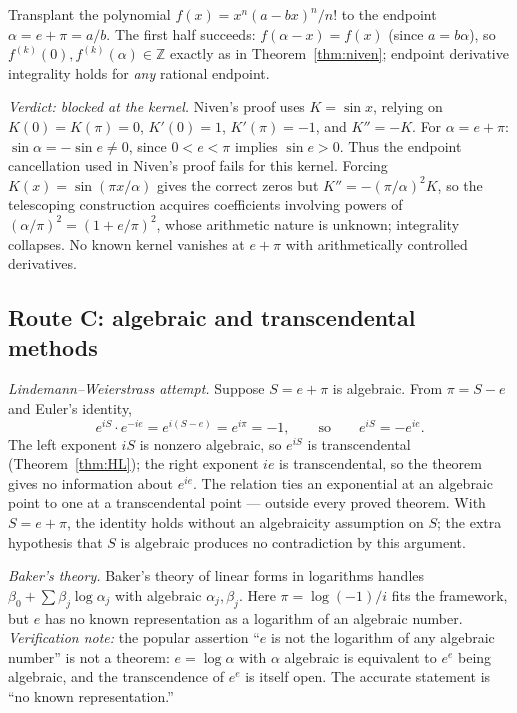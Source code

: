 \documentclass[11pt]{amsart}
\theoremstyle{definition}
\theoremstyle{remark}
\numberwithin{equation}{section}
\newcommand{\Z}{\mathbb{Z}}
\newcommand{\ee}{e}
\begin{document}
Transplant the polynomial $f(x)=x^n(a-bx)^n/n!$ to the endpoint $\alpha=e+\pi=a/b$. The first half succeeds: $f(\alpha-x)=f(x)$ (since $a=b\alpha$), so $f^{(k)}(0),f^{(k)}(\alpha)\in\Z$ exactly as in Theorem~\ref{thm:niven}; endpoint derivative integrality holds for \emph{any} rational endpoint.

\emph{Verdict: blocked at the kernel.} Niven's proof uses $K=\sin x$, relying on $K(0)=K(\pi)=0$, $K'(0)=1$, $K'(\pi)=-1$, and $K''=-K$. For $\alpha=e+\pi$: $\sin\alpha=-\sin e\ne0$, since $0<e<\pi$ implies $\sin e>0$. Thus the endpoint cancellation used in Niven's proof fails for this kernel. Forcing $K(x)=\sin(\pi x/\alpha)$ gives the correct zeros but $K''=-(\pi/\alpha)^2K$, so the telescoping construction acquires coefficients involving powers of $(\alpha/\pi)^2=(1+e/\pi)^2$, whose arithmetic nature is unknown; integrality collapses. No known kernel vanishes at $e+\pi$ with arithmetically controlled derivatives.

\subsection{Route C: algebraic and transcendental methods}\label{sub:route-c}

\emph{Lindemann--Weierstrass attempt.} Suppose $S=e+\pi$ is algebraic. From $\pi=S-e$ and Euler's identity,
\[
\ee^{iS}\cdot\ee^{-ie}=\ee^{i(S-e)}=\ee^{i\pi}=-1,\qquad\text{so}\qquad \ee^{iS}=-\ee^{ie}.
\]
The left exponent $iS$ is nonzero algebraic, so $\ee^{iS}$ is transcendental (Theorem~\ref{thm:HL}); the right exponent $ie$ is transcendental, so the theorem gives no information about $\ee^{ie}$. The relation ties an exponential at an algebraic point to one at a transcendental point --- outside every proved theorem. With $S=e+\pi$, the identity holds without an algebraicity assumption on $S$; the extra hypothesis that $S$ is algebraic produces no contradiction by this argument.

\emph{Baker's theory.} Baker's theory of linear forms in logarithms \cite{Baker} handles $\beta_0+\sum\beta_j\log\alpha_j$ with algebraic $\alpha_j,\beta_j$. Here $\pi=\log(-1)/i$ fits the framework, but $\ee$ has no known representation as a logarithm of an algebraic number. \emph{Verification note:} the popular assertion ``$\ee$ is not the logarithm of any algebraic number'' is not a theorem: $\ee=\log\alpha$ with $\alpha$ algebraic is equivalent to $\ee^\ee$ being algebraic, and the transcendence of $\ee^\ee$ is itself open. The accurate statement is ``no known representation.''
\end{document}
